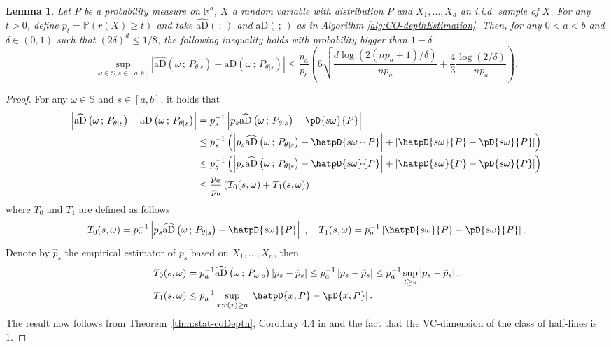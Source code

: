 \documentclass{article}
\numberwithin{equation}{section}
\newtheorem{lemma}{Lemma}[section]
\newcommand{\R}{\mathbb{R}}
\renewcommand{\P}{\mathbb{P}}
\newcommand{\sphere}{\mathbb{S}}
\newcommand{\aD}[2]{{\mathrm{aD}}\left({#1}\,;\,{#2}\right)}
\newcommand{\hataD}[2]{\widehat{\mathrm{aD}}\left({#1}\,;\,{#2}\right)}
\begin{document}
\begin{lemma}\label{lem:deviation_engular_depth} Let \(P\) be a
    probability measure on \(\R^d\), \(X\) a random variable with
    distribution \(P\) and \(X_1,\ldots,X_d\) an i.i.d. sample of
    \(X\). For any \(t>0\), define \(p_t=\P(r(X)\geq
    t)\) and take \(\hataD{}{}\) and \(\aD{}{}\) as in Algorithm
    \ref{alg:CO-depthEstimation}.
    Then, for any \(0<a<b\) and \(\delta\in(0,1)\) such that
    \((2\delta)^{d}\leq 1/8\), the following
    inequality holds with
    probability bigger than \(1-\delta\)
    \begin{equation}
        \sup_{\omega\in\sphere, s\in[a,b]} \left|
        \hataD{\omega}{P_{\theta|s}} - \aD{\omega}{P_{\theta|s}}
        \right|
        \le \frac{p_a}{p_b} \left(6\sqrt{\frac{d\log(2(np_a+1)/\delta)}{np_a}} +
        \frac{4}{3}\frac{\log(2/\delta)}{np_a}\right).
    \end{equation}
\end{lemma}
% 
\begin{proof}
    For any \(\omega\in\sphere\) and \(s\in[a,b]\), it holds that
    \begin{align*}
        \left|
        \hataD{\omega}{P_{\theta|s}} - \aD{\omega}{P_{\theta|s}}
        \right| &= p_s^{-1}\left| p_s \hataD{\omega}{P_{\theta|s}} -
        \pD{s\omega}{P}\right| \\
        &\leq p_s^{-1}\left( \left| p_s\hataD{\omega}{P_{\theta|s}} -
            \hatpD{s\omega}{P} \right| + \left|
        \hatpD{s\omega}{P}-\pD{s\omega}{P} \right| \right)\\
        &\leq p_b^{-1}\left( \left| p_s\hataD{\omega}{P_{\theta|s}} -
            \hatpD{s\omega}{P} \right| + \left|
        \hatpD{s\omega}{P}-\pD{s\omega}{P} \right| \right)\\
        &\leq \frac{p_a}{p_b}\left( T_0(s,\omega)+T_1(s,\omega)\right)
    \end{align*}
    where \(T_0\) and \(T_1\) are defined as follows
    \begin{equation*}
        T_0(s,\omega) = p_a^{-1}\left|
        p_s\hataD{\omega}{P_{\theta|s}} - \hatpD{s\omega}{P}
        \right|\;,\quad T_1(s,\omega)=p_a^{-1}\left|
        \hatpD{s\omega}{P}-\pD{s\omega}{P} \right|.
    \end{equation*}
    Denote by \(\hat{p}_s\) the empirical
    estimator of \(p_s\) based on \(X_1,\ldots,X_n\), then
    \begin{align}
        T_0(s,\omega)&=p_a^{-1}\hataD{\omega}{P_{\omega|s}} \left| p_s-\hat{p}_s
        \right|\leq p_a^{-1} \left| p_s-\hat{p}_s \right|\leq
        p_a^{-1}\sup_{t\geq a}\left| p_s-\hat{p}_s \right|,\\
        T_1(s,\omega) &\leq p_a^{-1}\sup_{x:r(x)\geq a} \left| \hatpD{x,P} -
        \pD{x,P} \right|.
    \end{align}
    The result now follows from Theorem~\ref{thm:stat-coDepth},
    Corollary 4.4 in \cite{lhaut2022uniform}
    and the fact that the VC-dimension of the class of half-lines is 1.
\end{proof}
\end{document}
